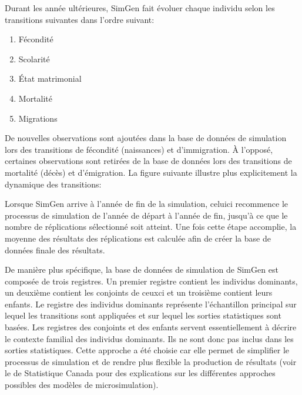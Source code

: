 \documentclass[letterpaper,10pt,french]{sphinxmanual}
\begin{document}
Durant les année ultérieures, SimGen fait évoluer chaque individu selon les transitions suivantes dans l’ordre suivant:
\begin{enumerate}
%
\item {} 
Fécondité

\item {} 
Scolarité

\item {} 
État matrimonial

\item {} 
Mortalité

\item {} 
Migrations

\end{enumerate}

De nouvelles observations sont ajoutées dans la base de données de simulation
lors des transitions de fécondité (naissances) et d’immigration. À l’opposé,
certaines observations sont retirées de la base de données lors des transitions de mortalité (décès) et
d’émigration. La figure suivante illustre plus explicitement la dynamique des transitions:

\begin{figure}[htbp]
\centering

\noindent{}
\end{figure}

Lorsque SimGen arrive à l’année de fin de la simulation, celui\sphinxhyphen{}ci recommence le processus de simulation
de l’année de départ à l’année de fin, jusqu’à ce que le nombre de réplications sélectionné soit atteint.
Une fois cette étape accomplie, la moyenne des résultats des réplications est calculée afin de créer
la base de données finale des résultats.


De manière plus spécifique, la base de données de simulation de SimGen est composée de trois registres. Un premier registre contient les individus dominants, un deuxième contient les conjoints de ceux\sphinxhyphen{}ci et
un troisième contient leurs enfants. Le registre des individus dominants représente l’échantillon principal sur lequel les transitions sont appliquées et sur lequel les sorties statistiques sont basées.
Les registres des conjoints et des enfants servent essentiellement à décrire le contexte familial des individus dominants. Ils ne sont donc pas inclus dans les sorties statistiques.
Cette approche a été choisie car elle permet de simplifier le processus de simulation et de rendre plus flexible la production de résultats
(voir le  de Statistique Canada
pour des explications sur les différentes approches possibles des modèles de microsimulation).
\end{document}
